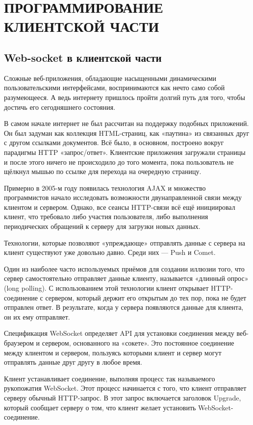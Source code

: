 \chapter{ПРОГРАММИРОВАНИЕ КЛИЕНТСКОЙ ЧАСТИ}
\section{Web-socket в клиентской части}

Сложные веб-приложения, обладающие насыщенными динамическими пользовательскими интерфейсами, воспринимаются как нечто само собой разумеющееся. А ведь интернету пришлось пройти долгий путь для того, чтобы достичь его сегодняшнего состояния.

В самом начале интернет не был рассчитан на поддержку подобных приложений. Он был задуман как коллекция HTML-страниц, как «паутина» из связанных друг с другом ссылками документов. Всё было, в основном, построено вокруг парадигмы HTTP «запрос/ответ». Клиентские приложения загружали страницы и после этого ничего не происходило до того момента, пока пользователь не щёлкнул мышью по ссылке для перехода на очередную страницу.

Примерно в 2005-м году появилась технология AJAX \cite{garrett2005ajax} и множество программистов начало исследовать возможности двунаправленной связи между клиентом и сервером. Однако, все сеансы HTTP-связи всё ещё инициировал клиент, что требовало либо участия пользователя, либо выполнения периодических обращений к серверу для загрузки новых данных.

Технологии, которые позволяют «упреждающе» отправлять данные с сервера на клиент существуют уже довольно давно. Среди них — Push и Comet.

Один из наиболее часто используемых приёмов для создании иллюзии того, что сервер самостоятельно отправляет данные клиенту, называется «длинный опрос» (long polling). С использованием этой технологии клиент открывает HTTP-соединение с сервером, который держит его открытым до тех пор, пока не будет отправлен ответ. В результате, когда у сервера появляются данные для клиента, он их ему отправляет.

Спецификация WebSocket определяет API для установки соединения между веб-браузером и сервером, основанного на «сокете». Это постоянное соединение между клиентом и сервером, пользуясь которыми клиент и сервер могут отправлять данные друг другу в любое время.

Клиент устанавливает соединение, выполняя процесс так называемого рукопожатия WebSocket. Этот процесс начинается с того, что клиент отправляет серверу обычный HTTP-запрос. В этот запрос включается заголовок Upgrade, который сообщает серверу о том, что клиент желает установить WebSocket-соединение.

